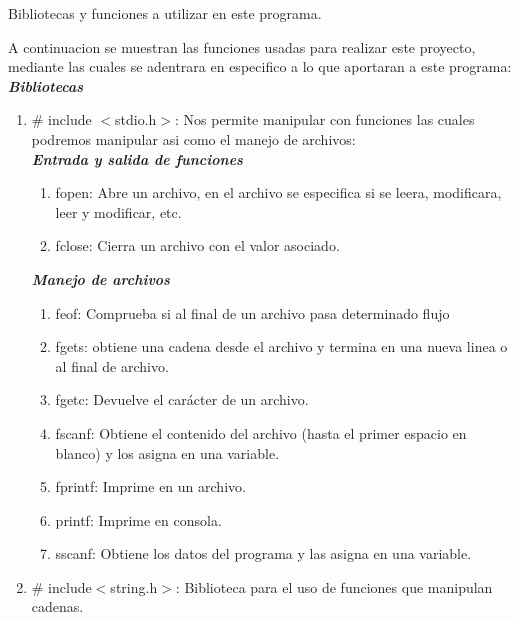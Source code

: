 \documentclass[12pt,letterpaper]{report}
\begin{document}
\begin{center}
Bibliotecas y funciones a utilizar en este programa.\\
\end{center}
A continuacion se muestran las funciones usadas para realizar este proyecto, mediante las cuales se adentrara en especifico a lo que aportaran a este programa:\\

\textbf{\textit{Bibliotecas}}\\


\begin{enumerate}

\item \# include $<$stdio.h$>$: Nos permite manipular con funciones las cuales podremos manipular  asi como el manejo de archivos:\\

\textbf{\textit{Entrada y salida de funciones}}
\begin{enumerate}

\item fopen: Abre un archivo, en el archivo se especifica si se leera, modificara, leer y modificar, etc.
\item fclose: Cierra un archivo con el valor asociado.

\end{enumerate}

\textbf{\textit{\em{Manejo de archivos}}}

\begin{enumerate}
\item feof: Comprueba si al final de un archivo pasa determinado flujo
\item fgets: obtiene una cadena desde el archivo y termina en una nueva linea o al final de archivo.
\item fgetc: Devuelve el carácter de un archivo.
\item fscanf: Obtiene el contenido del archivo (hasta el primer espacio en blanco) y los asigna en una variable.
\item fprintf: Imprime en un archivo.
\item printf: Imprime en consola.
\item sscanf: Obtiene los datos del programa y las asigna en una variable.
\end{enumerate}

\item\# include$<$string.h$>$: Biblioteca para el uso de funciones que manipulan cadenas.
\begin{enumerate}


\end{enumerate}
\end{enumerate}
\end{document}
